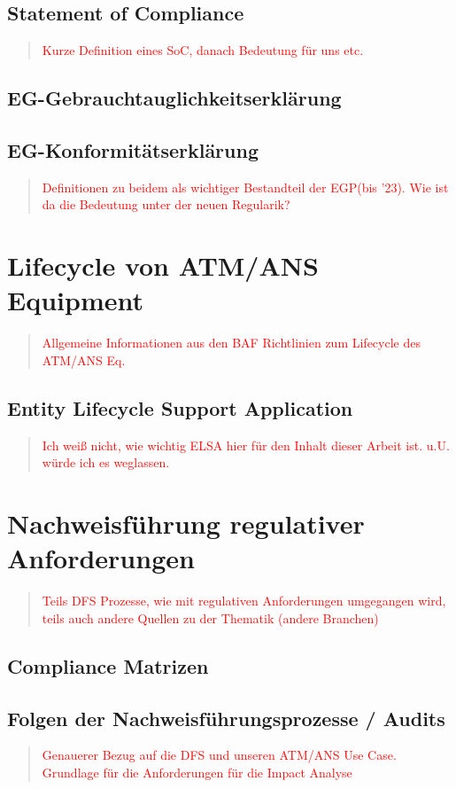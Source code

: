         \pagebreak
        \subsection{Statement of Compliance}

        \begin{quote}
\textcolor{red}{Kurze Definition eines SoC, danach Bedeutung für uns etc.}
\end{quote}

        \pagebreak
        \subsection{EG-Gebrauchtauglichkeitserklärung}
        \subsection{EG-Konformitätserklärung}

\begin{quote}
\textcolor{red}{Definitionen zu beidem als wichtiger Bestandteil der EGP(bis '23). Wie ist da die Bedeutung unter der neuen Regularik?}
\end{quote}
        
        \pagebreak
    \section{Lifecycle von ATM/ANS Equipment}

    \begin{quote}
\textcolor{red}{Allgemeine Informationen aus den BAF Richtlinien zum Lifecycle des ATM/ANS Eq.}
\end{quote}
    
        \subsection{Entity Lifecycle Support Application}

\begin{quote}
\textcolor{red}{Ich weiß nicht, wie wichtig ELSA hier für den Inhalt dieser Arbeit ist. u.U. würde ich es weglassen.}
\end{quote}
    \pagebreak
    \section{Nachweisführung regulativer Anforderungen}

\begin{quote}
\textcolor{red}{Teils DFS Prozesse, wie mit regulativen Anforderungen umgegangen wird, teils auch andere Quellen zu der Thematik (andere Branchen)}
\end{quote}
    
        \subsection{Compliance Matrizen}
        
        \subsection{Folgen der Nachweisführungsprozesse / Audits}

        
\begin{quote}
\textcolor{red}{Genauerer Bezug auf die DFS und unseren ATM/ANS Use Case. Grundlage für die Anforderungen für die Impact Analyse}
\end{quote}
        